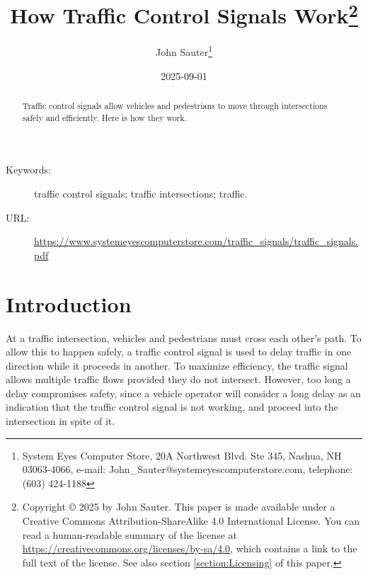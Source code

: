 \documentclass[letterpaper,twoside]{article}
\begin{document}
\title{How Traffic Control Signals Work\footnote{Copyright
    {\copyright} 2025 by John Sauter.
    This paper is made available under a
    Creative Commons Attribution-ShareAlike 4.0 International License.
    You can read a human-readable summary of the license at
    \href{https://creativecommons.org/licenses/by-sa/4.0}{https://creativecommons.org/licenses/by-sa/4.0},
    which contains a link to the full text of the license.
    See also section \ref{section:Licensing} of this paper.}
}
\author{John Sauter\footnote{
    System Eyes Computer Store,
    20A Northwest Blvd.  Ste 345,
    Nashua, NH  03063-4066,
    e-mail: John\_Sauter@systemeyescomputerstore.com,
    telephone: (603) 424-1188}}

\date{2025-09-01}
\maketitle
\begin{abstract}
  Traffic control signals allow vehicles and pedestrians to move through
  intersections safely and efficiently.  Here is how they work.
\end{abstract}
\begin{description}
\item[Keywords:]traffic control signals; traffic intersections; traffic.
\item[URL:]\href{https://www.systemeyescomputerstore.com/traffic\_signals/traffic\_signalst.pdf}{https://www.systemeyescomputerstore.com/traffic\_signals/traffic\_signals.pdf}
\end{description}
\newpage

\section{Introduction}
At a traffic intersection, vehicles and pedestrians must cross each other's
path.  To allow this to happen safely, a traffic control signal is used to
delay traffic in one direction while it proceeds in another.  To maximize
efficiency, the traffic signal allows multiple traffic flows provided they
do not intersect.  However, too long a delay compromises safety, since a
vehicle operator will consider a long delay as an indication that the
traffic control signal is not working, and proceed into the intersection
in spite of it.
\end{document}
